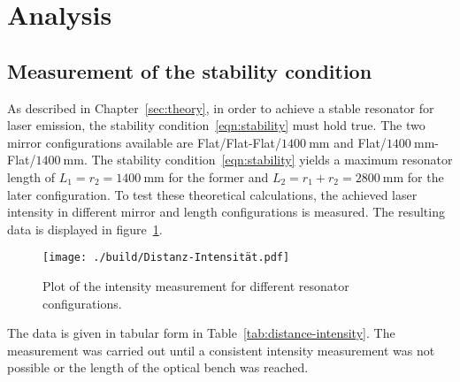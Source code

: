 \section{Analysis}
\subsection{Measurement of the stability condition}
As described in Chapter~\ref{sec:theory}, in order to achieve a stable resonator
for laser emission, the stability condition~\ref{eqn:stability} must hold true.
The two mirror configurations available are Flat/Flat-Flat/$\SI{1400}{\milli\meter}$ and
Flat/$\SI{1400}{\milli\meter}$-Flat/$\SI{1400}{\milli\meter}$. The stability condition~\ref{eqn:stability}
yields a maximum resonator length of $L_{1} = r_{2} = \SI{1400}{\milli\meter}$ for the former and
$L_{2} = r_{1} + r_{2} = \SI{2800}{\milli\meter}$ for the later configuration.
To test these theoretical calculations, the achieved laser intensity in different
mirror and length configurations is measured. The resulting data is displayed in figure~\ref{fig:distance-intensity}.
\begin{figure}[H]
 \centering
 \texttt{[image: ./build/Distanz-Intensität.pdf]}
 \caption{Plot of the intensity measurement for different resonator configurations.}
 \label{fig:distance-intensity}
\end{figure}
\noindent
The data is given in tabular form in Table~\ref{tab:distance-intensity}.
The measurement was carried out until a consistent intensity measurement was not possible or the length of the
optical bench was reached.
